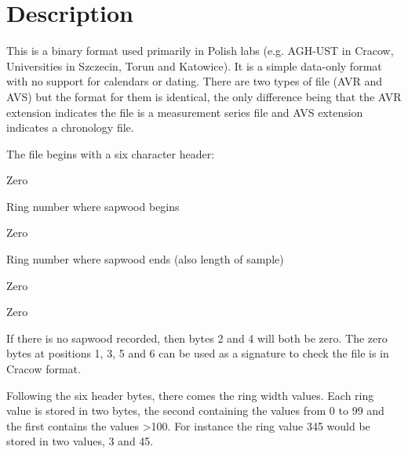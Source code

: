 \section{Description}

This is a binary format used primarily in Polish labs (e.g. AGH-UST in Cracow,
Universities in Szczecin, Torun and Katowice).  It is a simple data-only format with no support for calendars or dating.  There are two types of file (AVR and AVS) but the format for them is identical, the only difference being that the AVR extension indicates the file is a measurement series file and AVS extension indicates a chronology file.

The file begins with a six character header:

\begin{enumerate*}
 \item Zero
 \item Ring number where sapwood begins
 \item Zero
 \item Ring number where sapwood ends (also length of sample)
 \item Zero
 \item Zero
\end{enumerate*}

If there is no sapwood recorded, then bytes 2 and 4 will both be zero.  The zero bytes at positions 1, 3, 5 and 6 can be used as a signature to check the file is in Cracow format.

Following the six header bytes, there comes the ring width values.   Each ring value is stored in two bytes, the second containing the values from 0 to 99 and the first contains the values >100.  For instance the ring value 345 would be stored in two values, 3 and 45.  



